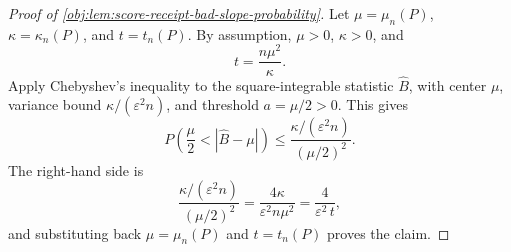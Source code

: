 \begin{proof}[Proof of \cref{obj:lem:score-receipt-bad-slope-probability}]
Let \(\mu=\mu_n(P)\), \(\kappa=\kappa_n(P)\), and \(t=t_n(P)\). By assumption, \(\mu>0\), \(\kappa>0\), and
\[
t=\frac{n\mu^2}{\kappa}.
\]
Apply Chebyshev's inequality to the square-integrable statistic \(\widehat B\), with center \(\mu\), variance bound \(\kappa/(\varepsilon^2n)\), and threshold \(a=\mu/2>0\). This gives
\[
P\!\left(\frac{\mu}{2}<|\widehat B-\mu|\right)
\le
\frac{\kappa/(\varepsilon^2n)}{(\mu/2)^2}.
\] %
The right-hand side is
\[
\frac{\kappa/(\varepsilon^2n)}{(\mu/2)^2}
=
\frac{4\kappa}{\varepsilon^2 n\mu^2}
=
\frac4{\varepsilon^2\,t},
\] %
and substituting back \(\mu=\mu_n(P)\) and \(t=t_n(P)\) proves the claim. %
\end{proof}
